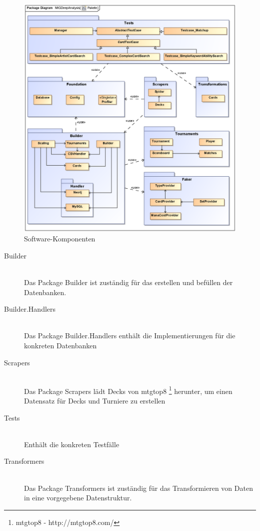 \begin{figure}[H]
    \myfloatalign
    \includegraphics[width=\textwidth]{gfx/sw-components.eps}
    \caption{Software-Komponenten}
    \label{fig:sw-components}
\end{figure}
\begin{description}
    \item[Builder] \hfill \\
        Das Package Builder ist zuständig für das erstellen und befüllen der Datenbanken.
    
    \item[Builder.Handlers]  \hfill \\
        Das Package Builder.Handlers enthält die Implementierungen für die konkreten Datenbanken
    
    \item[Scrapers]  \hfill \\
         Das Package Scrapers lädt Decks von mtgtop8 \footnote{mtgtop8 - http://mtgtop8.com/} herunter, um einen Datensatz für Decks und Turniere zu erstellen
    
    \item[Tests]  \hfill \\
        Enthält die konkreten Testfälle
    
    \item[Transformers]  \hfill \\
        Das Package Transformers ist zuständig für das Transformieren von Daten in eine vorgegebene Datenstruktur.
\end{description}

